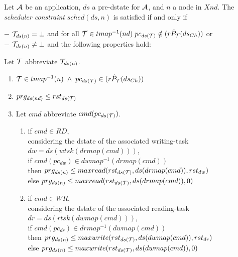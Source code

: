 \documentclass{article}
\begin{document}
\begin{definition}\label{def-sched} Let ${\cal A}$ be an application, $ds$ a pre-dstate for ${\cal A}$, and $n$ a node in $X\!nd$. The {\em scheduler constraint} $sched(ds,n)$ is satisfied if and only if

\vspace{0.5mm}
$-$ ${\cal T}_{ds(n)}= \bot$ and for all ${\cal T}\in tmap^{-1}(nd)\;pc_{ds({\cal T})}\notin (r\hat P_{{\cal T}}(ds_{Ch}))$ or\\
$-$ ${\cal T}_{ds(n)}\neq \bot$ and the following properties hold:

Let ${\cal T}$ abbreviate ${\cal T}_{ds(n)}$. 
\begin{enumerate}
\item ${\cal T}\in tmap^{-1}(n)\;\wedge\; pc_{ds({\cal T})}\in (r\hat P_{{\cal T}}(ds_{Ch}))$
\item $prg_{ds(nd)} \leq rst_{ds({\cal T})}$
\item  Let $cmd$ abbreviate $cmd(pc_{ds({\cal T})})$.
			  \begin{enumerate}
				\item if $cmd\in RD$,\\ considering the dstate of the associated writing-task $dw= ds(wtsk(drmap(cmd)))$,\\ 
				\hspace*{2mm} if $cmd(pc_{dw})\in dwmap^{-1}(drmap(cmd))$\\
				\hspace*{2mm} then $prg_{ds(n)}\leq maxread(rst_{ds({\cal T})},ds(drmap(cmd)),rst_{dw})$\\
				\hspace*{2mm} else $prg_{ds(n)}\leq maxread(rst_{ds({\cal T})},ds(drmap(cmd)),0)$
				\item if $cmd\in W\!R$,\\ considering the dstate of the associated reading-task $dr=ds(rtsk(dwmap(cmd)))$,\\ 
				\hspace*{2mm} if $cmd(pc_{dr})\in drmap^{-1}(dwmap(cmd))$\\
				\hspace*{2mm} then $prg_{ds(n)}\leq maxwrite(rst_{ds({\cal T})},ds(dwmap(cmd)),rst_{dr})$\\
				\hspace*{2mm} else $prg_{ds(n)}\leq maxwrite(rst_{ds({\cal T})},ds(dwmap(cmd)),0)$
				\end{enumerate}
\end{enumerate}

\end{definition}
\end{document}
